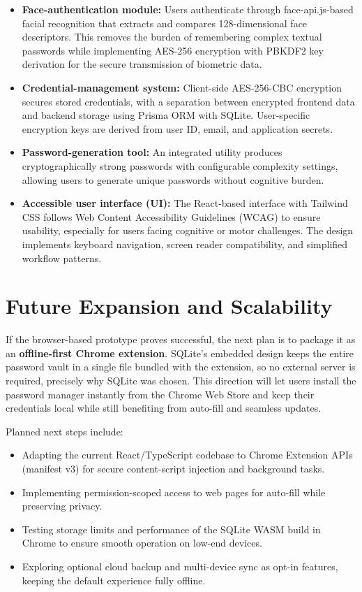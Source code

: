 \begin{itemize}
  \item \textbf{Face-authentication module:} Users authenticate through face-api.js-based facial recognition that extracts and compares 128-dimensional face descriptors. This removes the burden of remembering complex textual passwords while implementing AES-256 encryption with PBKDF2 key derivation for the secure transmission of biometric data.
  
  \item \textbf{Credential-management system:} Client-side AES-256-CBC encryption secures stored credentials, with a separation between encrypted frontend data and backend storage using Prisma ORM with SQLite. User-specific encryption keys are derived from user ID, email, and application secrets.
  
  \item \textbf{Password-generation tool:} An integrated utility produces cryptographically strong passwords with configurable complexity settings, allowing users to generate unique passwords without cognitive burden.
  
  \item \textbf{Accessible user interface (UI):} The React-based interface with Tailwind CSS follows Web Content Accessibility Guidelines (WCAG) to ensure usability, especially for users facing cognitive or motor challenges. The design implements keyboard navigation, screen reader compatibility, and simplified workflow patterns.
\end{itemize}

\section{Future Expansion and Scalability}
If the browser-based prototype proves successful, the next plan is to
package it as an \textbf{offline-first Chrome extension}.  
SQLite's embedded design keeps the entire password vault in a single file
bundled with the extension, so no external server is required, precisely why
SQLite was chosen.  This direction will let users install the password manager
instantly from the Chrome Web Store and keep their credentials local while
still benefiting from auto-fill and seamless updates.

Planned next steps include:
\begin{itemize}
  \item Adapting the current React/TypeScript codebase to Chrome Extension
        APIs (manifest v3) for secure content-script injection and
        background tasks.
  \item Implementing permission-scoped access to web pages for auto-fill
        while preserving privacy.
  \item Testing storage limits and performance of the SQLite WASM build in
        Chrome to ensure smooth operation on low-end devices.
  \item Exploring optional cloud backup and multi-device sync as opt-in
        features, keeping the default experience fully offline.
\end{itemize}


